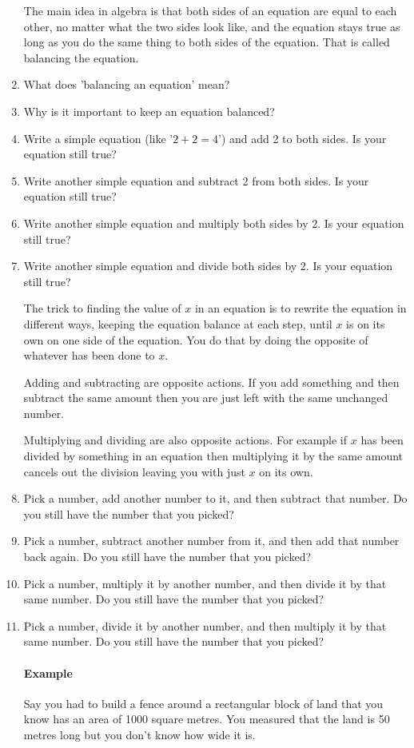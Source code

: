 \documentclass{article}
\begin{document}
\begin{spacing}{1.25}
\begin{enumerate}
The main idea in algebra is that both sides of an equation are equal to each other, no matter what the two sides look like, and the equation stays true as long as you do the same thing to both sides of the equation. That is called balancing the equation.

\item What does 'balancing an equation' mean?
\item Why is it important to keep an equation balanced?
\item Write a simple equation (like '$2+2=4$') and add 2 to both sides. Is your equation still true?
\item Write another simple equation and subtract 2 from both sides. Is your equation still true?
\item Write another simple equation and multiply both sides by 2. Is your equation still true?
\item Write another simple equation and divide both sides by 2. Is your equation still true?

The trick to finding the value of $x$ in an equation is to rewrite the equation in different ways, keeping the equation balance at each step, until $x$ is on its own on one side of the equation. You do that by doing the opposite of whatever has been done to $x$.

Adding and subtracting are opposite actions. If you add something and then subtract the same amount then you are just left with the same unchanged number.

Multiplying and dividing are also opposite actions. For example if $x$ has been divided by something in an equation then multiplying it by the same amount cancels out the division leaving you with just $x$ on its own.

\item Pick a number, add another number to it, and then subtract that number. Do you still have the number that you picked?
\item Pick a number, subtract another number from it, and then add that number back again. Do you still have the number that you picked?
\item Pick a number, multiply it by another number, and then divide it by that same number. Do you still have the number that you picked?
\item Pick a number, divide it by another number, and then multiply it by that same number. Do you still have the number that you picked?

\paragraph{Example}
Say you had to build a fence around a rectangular block of land that you know has an area of 1000 square metres. You measured that the land is 50 metres long but you don't know how wide it is.


\end{enumerate}
\end{spacing}
\end{document}

